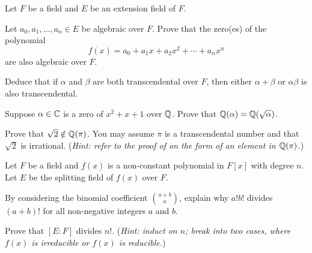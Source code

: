 \begin{problem}
    Let $F$ be a field and $E$ be an extension field of $F$.
    \begin{partquestions}{\roman*}
        \item Let $a_0, a_1, \dots, a_n \in E$ be algebraic over $F$. Prove that the zero(es) of the polynomial
        \[
            f(x) = a_0 + a_1x + a_2x^2 + \cdots + a_nx^n
        \]
        are also algebraic over $F$.

        \item Deduce that if $\alpha$ and $\beta$ are both transcendental over $F$, then either $\alpha+\beta$ or $\alpha\beta$ is also transcendental.
    \end{partquestions}
\end{problem}

\begin{problem}
    Suppose $\alpha \in \mathbb{C}$ is a zero of $x^2 + x + 1$ over $\mathbb{Q}$. Prove that $\mathbb{Q}(\alpha) = \mathbb{Q}(\sqrt{\alpha})$.
\end{problem}

\begin{problem}
    Prove that $\sqrt2 \notin \mathbb{Q}(\pi)$. You may assume $\pi$ is a transcendental number and that $\sqrt2$ is irrational.\newline
    (\textit{Hint: refer to the proof of  on the form of an element in $\mathbb{Q}(\pi)$.})
\end{problem}

\begin{problem}
    Let $F$ be a field and $f(x)$ is a non-constant polynomial in $F[x]$ with degree $n$. Let $E$ be the splitting field of $f(x)$ over $F$.
    \begin{partquestions}{\roman*}
        \item By considering the binomial coefficient ${a+b\choose a}$, explain why $a!b!$ divides $(a+b)!$ for all non-negative integers $a$ and $b$.
        \item Prove that $[E:F]$ divides $n!$.\newline
        (\textit{Hint: induct on $n$; break into two cases, where $f(x)$ is irreducible or $f(x)$ is reducible.})
    \end{partquestions}
\end{problem}
